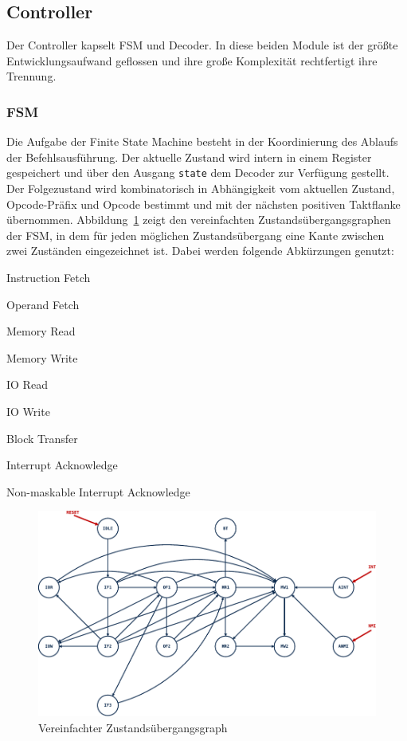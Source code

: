 \documentclass[ngerman, cd=lightcolor]{tudscrreprt}
\begin{document}
\subsection{Controller}

Der Controller kapselt FSM und Decoder. In diese beiden Module ist der größte
Entwicklungsaufwand geflossen und ihre große Komplexität rechtfertigt
ihre Trennung.

\subsubsection{FSM}

Die Aufgabe der Finite State Machine besteht in der Koordinierung des Ablaufs
der Befehlsausführung. Der aktuelle Zustand wird intern in einem Register
gespeichert und über den Ausgang \texttt{state} dem Decoder zur Verfügung
gestellt. Der Folgezustand wird kombinatorisch in Abhängigkeit vom aktuellen
Zustand, Opcode-Präfix und Opcode bestimmt und mit der nächsten positiven
Taktflanke übernommen. Abbildung~\ref{img:fsm-states} zeigt den vereinfachten
Zustandsübergangsgraphen der FSM, in dem für jeden möglichen Zustandsübergang
eine Kante zwischen zwei Zuständen eingezeichnet ist. Dabei werden folgende
Abkürzungen genutzt:

\begin{description}[leftmargin=!,labelwidth=50px,itemsep=0pt]
  \item[IF:] Instruction Fetch
  \item[OF:] Operand Fetch
  \item[MR:] Memory Read
  \item[MW:] Memory Write
  \item[IOR:] IO Read
  \item[IOW:] IO Write
  \item[BT:] Block Transfer
  \item[AINT:] Interrupt Acknowledge
  \item[ANMI:] Non-maskable Interrupt Acknowledge
\end{description}

\begin{figure}
  \centering
    \includegraphics[width=\textwidth]{resources/pdf/fsm-states.pdf}
  \caption{Vereinfachter Zustandsübergangsgraph}
  \label{img:fsm-states}
\end{figure}
\end{document}
